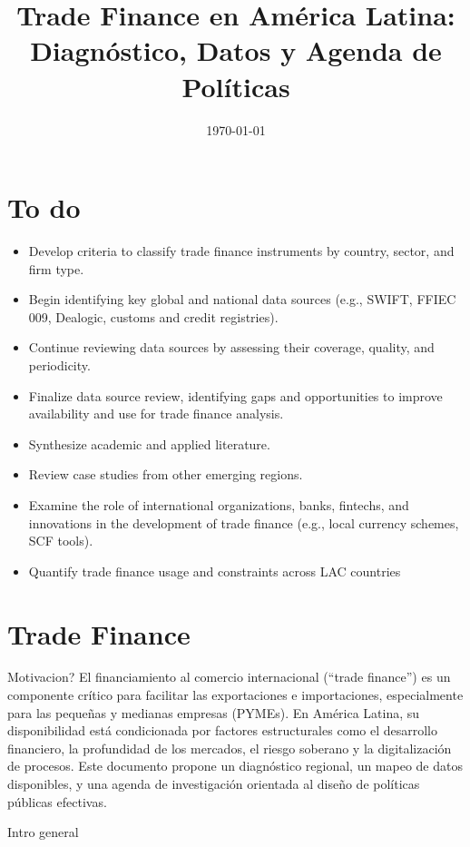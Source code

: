\documentclass[11pt]{article}
\title{Trade Finance en América Latina: Diagnóstico, Datos y Agenda de Políticas}
\date{\today}
\begin{document}
\maketitle

\section*{To do}

\begin{itemize}
    \item Develop criteria to classify trade finance instruments by country, sector, and firm type.
    \item Begin identifying key global and national data sources (e.g., SWIFT, FFIEC 009, Dealogic, customs and credit registries).
    \item  Continue reviewing data sources by assessing their coverage, quality, and periodicity.    
    \item Finalize data source review, identifying gaps and opportunities to improve availability and use for trade finance analysis.
    \item Synthesize academic and applied literature.
    \item Review case studies from other emerging regions.
    \item Examine the role of international organizations, banks, fintechs, and innovations in the development of trade finance (e.g., local currency schemes, SCF tools).
    \item Quantify trade finance usage and constraints across LAC countries
\end{itemize}


\section{Trade Finance}

Motivacion? El financiamiento al comercio internacional (``trade finance'') es un componente crítico para facilitar las exportaciones e importaciones, especialmente para las pequeñas y medianas empresas (PYMEs). En América Latina, su disponibilidad está condicionada por factores estructurales como el desarrollo financiero, la profundidad de los mercados, el riesgo soberano y la digitalización de procesos. Este documento propone un diagnóstico regional, un mapeo de datos disponibles, y una agenda de investigación orientada al diseño de políticas públicas efectivas.

Intro general
\end{document}
